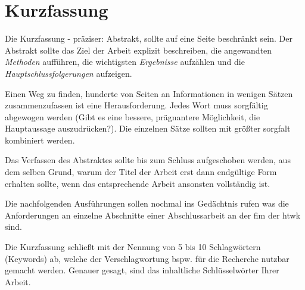 

\clearpage
\chapter*{Kurzfassung}
Die Kurzfassung - präziser: Abstrakt, sollte auf eine Seite beschränkt sein. Der Abstrakt
sollte das Ziel der Arbeit explizit beschreiben, die angewandten \textit{Methoden} aufführen, die
wichtigsten \textit{Ergebnisse} aufzählen und die \textit{Hauptschlussfolgerungen} aufzeigen.

Einen Weg zu finden, hunderte von Seiten an Informationen in wenigen Sätzen zusammenzufassen
ist eine Herausforderung. Jedes Wort muss sorgfältig abgewogen werden
(Gibt es eine bessere, prägnantere Möglichkeit, die Hauptaussage auszudrücken?). Die
einzelnen Sätze sollten mit größter sorgfalt kombiniert werden.

Das Verfassen des Abstraktes sollte bis zum Schluss aufgeschoben werden, aus dem
selben Grund, warum der Titel der Arbeit erst dann endgültige Form erhalten sollte,
wenn das entsprechende Arbeit ansonsten vollständig ist.

Die nachfolgenden Ausführungen sollen nochmal ins Gedächtnis rufen was die Anforderungen an einzelne Abschnitte einer Abschlussarbeit
an der \ac{fim} der \ac{htwk} sind.

Die Kurzfassung schließt mit der Nennung von 5 bis 10 Schlagwörtern (Keywords) ab,
welche der Verschlagwortung bspw. für die Recherche nutzbar gemacht werden. Genauer gesagt, sind das inhaltliche Schlüsselwörter Ihrer Arbeit.\\\\



